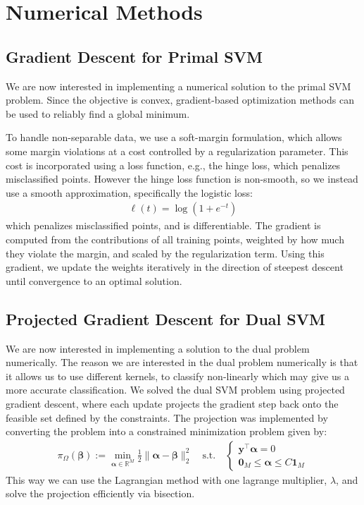 \section{Numerical Methods}
\label{chap:numerical_methods}
\vspace{-0.4cm}
\subsection{Gradient Descent for Primal SVM}
We are now interested in implementing a numerical solution to the primal SVM problem. Since the objective is convex, gradient-based optimization methods can be used to reliably find a global minimum.

To handle non-separable data, we use a soft-margin formulation, which allows some margin violations at a cost controlled by a regularization parameter. This cost is incorporated using a loss function, e.g., the hinge loss, which penalizes misclassified points.
However the hinge loss function is non-smooth, so we instead use a smooth approximation, specifically the logistic loss:
\begin{align*}
    \ell(t) = \log(1 + e^{-t}) 
\end{align*}
which penalizes misclassified points, and is differentiable. 
The gradient is computed from the contributions of all training points, weighted by how much they violate the margin, and scaled by the regularization term.
Using this gradient, we update the weights iteratively in the direction of steepest descent until convergence to an optimal solution.

\subsection{Projected Gradient Descent for Dual SVM}
We are now interested in implementing a solution to the dual problem numerically. 
The reason we are interested in the dual problem numerically is that it allows us to use different kernels, to classify non-linearly which may give us a more accurate classification.
We solved the dual SVM problem using projected gradient descent, where each update projects the gradient step back onto the feasible set defined by the constraints.
The projection was implemented by converting the problem into a constrained minimization problem given by:
\begin{align*}
\pi_{\Omega}(\symbf{\beta}) := \min_{\symbf{\alpha} \in \mathbb{R}^M} \frac{1}{2} \|\symbf{\alpha} - \symbf{\beta}\|_2^2 \quad \text{s.t.} \quad
\begin{cases}
\symbf{y}^\top \symbf{\alpha} = 0 \\
\symbf{0}_M \leq \symbf{\alpha} \leq C\symbf{1}_M
\end{cases}
\end{align*}
This way we can use the Lagrangian method with one lagrange multiplier, $\lambda$, and solve the projection efficiently via bisection.
\vspace{-1.0em}
